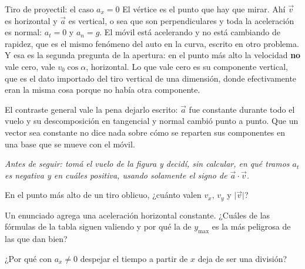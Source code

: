\documentclass[11pt,openany]{book}
\begin{document}
\begin{bloque}{Tiro de proyectil: el caso $a_x = 0$}
El vértice es el punto que hay que mirar. Ahí $\vec v$ es horizontal y $\vec a$ es vertical, o sea que son perpendiculares y toda la aceleración es normal: $a_t = 0$ y $a_n = g$. El móvil está acelerando y no está cambiando de rapidez, que es el mismo fenómeno del auto en la curva, escrito en otro problema. Y esa es la segunda pregunta de la apertura: en el punto más alto la velocidad \textbf{no} vale cero, vale $v_0\cos\alpha$, horizontal. Lo que vale cero es su componente vertical, que es el dato importado del tiro vertical de una dimensión, donde efectivamente eran la misma cosa porque no había otra componente.

El contraste general vale la pena dejarlo escrito: $\vec a$ fue constante durante todo el vuelo y su descomposición en tangencial y normal cambió punto a punto. Que un vector sea constante no dice nada sobre cómo se reparten sus componentes en una base que se mueve con el móvil.

\textit{Antes de seguir: tomá el vuelo de la figura y decidí, sin calcular, en qué tramos $a_t$ es negativa y en cuáles positiva, usando solamente el signo de $\vec a\cdot\vec v$.}
\end{bloque}

\begin{chequeo}
\item En el punto más alto de un tiro oblicuo, ¿cuánto valen $v_x$, $v_y$ y $\lvert\vec v\rvert$?
\item Un enunciado agrega una aceleración horizontal constante. ¿Cuáles de las fórmulas de la tabla siguen valiendo y por qué la de $y_{\max}$ es la más peligrosa de las que dan bien?
\item ¿Por qué con $a_x \neq 0$ despejar el tiempo a partir de $x$ deja de ser una división?
\end{chequeo}
\end{document}
